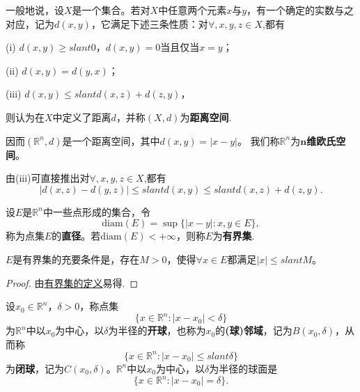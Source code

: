 \documentclass[../../main.tex]{subfiles}
\begin{document}
\begin{definition}[距离空间]\label{definition:距离空间}
一般地说，设\(X\)是一个集合。若对\(X\)中任意两个元素\(x\)与\(y\)，有一个确定的实数与之对应，记为\(d(x,y)\)，它满足下述三条性质：对$\forall,x,y,z\in X$,都有

(i) \(d(x,y)\geqslant slant0\)，\(d(x,y)=0\)当且仅当\(x = y\)；

(ii) \(d(x,y)=d(y,x)\)；

(iii) \(d(x,y)\leqslant slant d(x,z)+d(z,y)\)，

则认为在\(X\)中定义了距离\(d\)，并称\((X,d)\)为\textbf{距离空间}.
\end{definition}
\begin{note}
因而\((\mathbb{R}^n,d)\)是一个距离空间，其中\(d(x,y)=|x - y|\)。
我们称\(\mathbb{R}^n\)为\textbf{\(\boldsymbol{n}\)维欧氏空间}。
\end{note}
\begin{remark}
由(iii)可直接推出对$\forall,x,y,z\in X$,都有
\[
|d(x,z)-d(y,z)|\leqslant slant d(x,y)\leqslant slant d(x,z)+d(z,y).
\]
\end{remark}

\begin{definition}[点集的直径与有界集]\label{definition:点集的直径与有界集}
设\(E\)是\(\mathbb{R}^n\)中一些点形成的集合，令
\[\text{diam}(E)=\sup\{|x - y|:x,y\in E\},\]
称为点集\(E\)的\textbf{直径}。若\(\text{diam}(E)<+\infty\)，则称\(E\)为\textbf{有界集}.
\end{definition}

\begin{proposition}[有界集的充要条件]\label{proposition:有界集的充要条件}
  \(E\)是有界集的充要条件是，存在\(M > 0\)，使得\(\forall x\in E\)都满足\(|x|\leqslant slant M\)。
\end{proposition}
\begin{proof}
  由\hyperref[definition:点集的直径与有界集]{有界集的定义}易得.
\end{proof}

\begin{definition}[点的(球)邻域]\label{definition:点的(球)邻域}
  设\(x_0\in\mathbb{R}^n\)，\(\delta>0\)，称点集
\[\{x\in\mathbb{R}^n:|x - x_0|<\delta\}\]
为\(\mathbb{R}^n\)中以\(x_0\)为中心，以\(\delta\)为半径的\textbf{开球}，也称为\(x_0\)的\textbf{(球)邻域}，记为\(B(x_0,\delta)\)，从而称
\[\{x\in\mathbb{R}^n:|x - x_0|\leqslant slant\delta\}\]
为\textbf{闭球}，记为\(C(x_0,\delta)\)。\(\mathbb{R}^n\)中以\(x_0\)为中心，以\(\delta\)为半径的球面是
\[\{x\in\mathbb{R}^n:|x - x_0|=\delta\}.\]
\end{definition}
\end{document}

